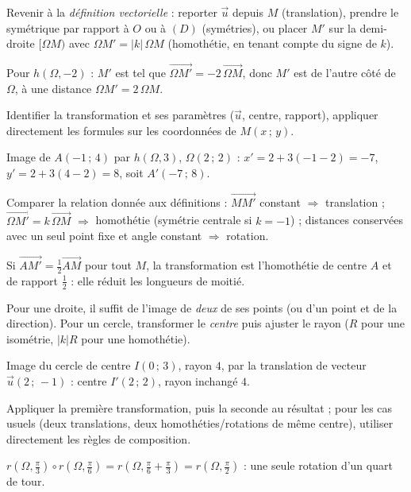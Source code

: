 Revenir à la \emph{définition vectorielle} : reporter $\vec u$ depuis $M$
(translation), prendre le symétrique par rapport à $O$ ou à $(D)$ (symétries), ou
placer $M'$ sur la demi-droite $[\Omega M)$ avec $\Omega M'=|k|\,\Omega M$ (homothétie,
en tenant compte du signe de $k$).
\begin{exemple}
Pour $h(\Omega,-2)$ : $M'$ est tel que $\overrightarrow{\Omega M'}=-2\,\overrightarrow{\Omega M}$,
donc $M'$ est de l'autre côté de $\Omega$, à une distance $\Omega M'=2\,\Omega M$.
\end{exemple}

Identifier la transformation et ses paramètres ($\vec u$, centre, rapport),
appliquer directement les formules sur les coordonnées de $M(x\,;\,y)$.
\begin{exemple}
Image de $A(-1\,;\,4)$ par $h(\Omega,3)$, $\Omega(2\,;\,2)$ :
$x'=2+3(-1-2)=-7$, $y'=2+3(4-2)=8$, soit $A'(-7\,;\,8)$.
\end{exemple}

Comparer la relation donnée aux définitions : $\overrightarrow{MM'}$ constant
$\Rightarrow$ translation ; $\overrightarrow{\Omega M'}=k\,\overrightarrow{\Omega M}$
$\Rightarrow$ homothétie (symétrie centrale si $k=-1$) ; distances conservées avec un
seul point fixe et angle constant $\Rightarrow$ rotation.
\begin{exemple}
Si $\overrightarrow{AM'}=\tfrac{1}{2}\overrightarrow{AM}$ pour tout $M$, la
transformation est l'homothétie de centre $A$ et de rapport $\tfrac{1}{2}$ : elle
réduit les longueurs de moitié.
\end{exemple}

Pour une droite, il suffit de l'image de \emph{deux} de ses points (ou d'un point et
de la direction). Pour un cercle, transformer le \emph{centre} puis ajuster le rayon
($R$ pour une isométrie, $|k|R$ pour une homothétie).
\begin{exemple}
Image du cercle de centre $I(0\,;\,3)$, rayon $4$, par la translation de vecteur
$\vec u(2\,;\,-1)$ : centre $I'(2\,;\,2)$, rayon inchangé $4$.
\end{exemple}

Appliquer la première transformation, puis la seconde au résultat ; pour les cas
usuels (deux translations, deux homothéties/rotations de même centre), utiliser
directement les règles de composition.
\begin{exemple}
$r(\Omega,\frac{\pi}{3})\circ r(\Omega,\frac{\pi}{6})=r(\Omega,\frac{\pi}{6}+\frac{\pi}{3})
=r(\Omega,\frac{\pi}{2})$ : une seule rotation d'un quart de tour.
\end{exemple}

